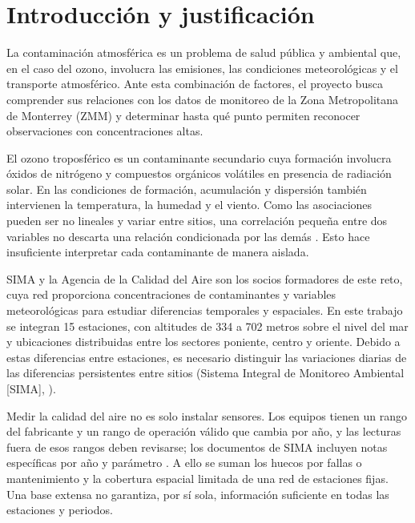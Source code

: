 \documentclass[11pt,letterpaper]{article}
\begin{document}
\clearpage
{}

\section{Introducción y justificación}
La contaminación atmosférica es un problema de salud pública y ambiental que, en el caso del ozono, involucra las emisiones, las condiciones meteorológicas y el transporte atmosférico. Ante esta combinación de factores, el proyecto busca comprender sus relaciones con los datos de monitoreo de la Zona Metropolitana de Monterrey (ZMM) y determinar hasta qué punto permiten reconocer observaciones con concentraciones altas.

El ozono troposférico es un contaminante secundario cuya formación involucra óxidos de nitrógeno y compuestos orgánicos volátiles en presencia de radiación solar. En las condiciones de formación, acumulación y dispersión también intervienen la temperatura, la humedad y el viento. Como las asociaciones pueden ser no lineales y variar entre sitios, una correlación pequeña entre dos variables no descarta una relación condicionada por las demás \citep{iglesias2020,seinfeld2016}. Esto hace insuficiente interpretar cada contaminante de manera aislada.

SIMA y la Agencia de la Calidad del Aire son los socios formadores de este reto, cuya red proporciona concentraciones de contaminantes y variables meteorológicas para estudiar diferencias temporales y espaciales. En este trabajo se integran 15 estaciones, con altitudes de 334 a 702 metros sobre el nivel del mar y ubicaciones distribuidas entre los sectores poniente, centro y oriente. Debido a estas diferencias entre estaciones, es necesario distinguir las variaciones diarias de las diferencias persistentes entre sitios (Sistema Integral de Monitoreo Ambiental [SIMA], \citeyear{simaubicacion}).

Medir la calidad del aire no es solo instalar sensores. Los equipos tienen un rango del fabricante y un rango de operación válido que cambia por año, y las lecturas fuera de esos rangos deben revisarse; los documentos de SIMA incluyen notas específicas por año y parámetro \citep{simarangos}. A ello se suman los huecos por fallas o mantenimiento y la cobertura espacial limitada de una red de estaciones fijas. Una base extensa no garantiza, por sí sola, información suficiente en todas las estaciones y periodos.
\end{document}
